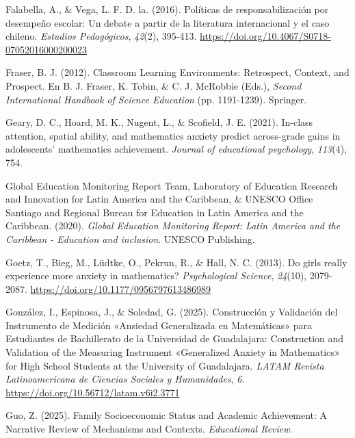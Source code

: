 \documentclass[
  spanish,
  a4paper,
  oneside]{scrbook}
\newlength{\cslhangindent}
\newenvironment{CSLReferences}[2] %
 {\begin{list}{}{%
  \setlength{\itemindent}{0pt}
  \setlength{\leftmargin}{0pt}
  \setlength{\parsep}{0pt}
  \ifodd #1
   \setlength{\leftmargin}{\cslhangindent}
   \setlength{\itemindent}{-1\cslhangindent}
  \fi
  \setlength{\itemsep}{#2\baselineskip}}}
 {\end{list}}
\begin{document}
\begin{CSLReferences}{1}{0}
Falabella, A., \& Vega, L. F. D. la. (2016). Pol{í}ticas de
responsabilizaci{ó}n por desempe{ñ}o escolar: Un debate a partir de la
literatura internacional y el caso chileno. \emph{Estudios
Pedag{ó}gicos}, \emph{42}(2), 395-413.
\url{https://doi.org/10.4067/S0718-07052016000200023}

Fraser, B. J. (2012). Classroom Learning Environments: Retrospect,
Context, and Prospect. En B. J. Fraser, K. Tobin, \& C. J. McRobbie
(Eds.), \emph{Second International Handbook of Science Education} (pp.
1191-1239). Springer.

Geary, D. C., Hoard, M. K., Nugent, L., \& Scofield, J. E. (2021).
In-class attention, spatial ability, and mathematics anxiety predict
across-grade gains in adolescents' mathematics achievement.
\emph{Journal of educational psychology}, \emph{113}(4), 754.

Global Education Monitoring Report Team, Laboratory of Education
Research and Innovation for Latin America and the Caribbean, \& UNESCO
Office Santiago and Regional Bureau for Education in Latin America and
the Caribbean. (2020). \emph{Global Education Monitoring Report: Latin
America and the Caribbean - Education and inclusion}. UNESCO Publishing.

Goetz, T., Bieg, M., Lüdtke, O., Pekrun, R., \& Hall, N. C. (2013). Do
girls really experience more anxiety in mathematics? \emph{Psychological
Science}, \emph{24}(10), 2079-2087.
\url{https://doi.org/10.1177/0956797613486989}

González, I., Espinosa, J., \& Soledad, G. (2025). Construcción y
Validación del Instrumento de Medición {«Ansiedad Generalizada en
Matemáticas»} para Estudiantes de Bachillerato de la Universidad de
Guadalajara: Construction and Validation of the Measuring Instrument
{«Generalized Anxiety in Mathematics»} for High School Students at the
University of Guadalajara. \emph{LATAM Revista Latinoamericana de
Ciencias Sociales y Humanidades}, \emph{6}.
\url{https://doi.org/10.56712/latam.v6i2.3771}

Guo, Z. (2025). Family Socioeconomic Status and Academic Achievement: A
Narrative Review of Mechanisms and Contexts. \emph{Educational Review}.


\end{CSLReferences}
\end{document}
